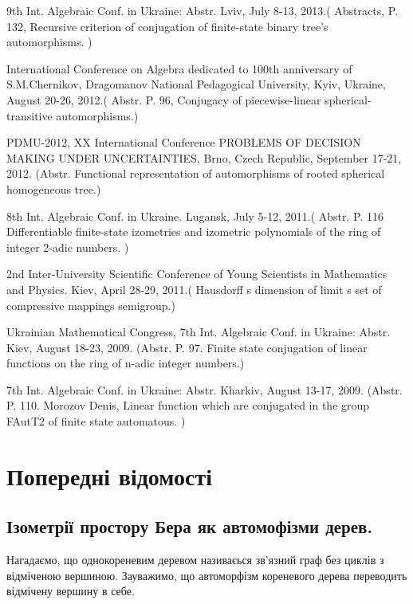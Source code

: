 \documentclass[a4paper,12pt]{article} \usepackage{a4wide}
\numberwithin{equation}{subsection}
\begin{document}
9th Int. Algebraic Conf. in Ukraine: Abstr. Lviv, July 8-13, 2013.( Abstracts, P. 132, Recursive criterion of conjugation of finite-state binary tree’s
automorphisms. ) 


International Conference on Algebra dedicated to 100th anniversary of S.M.Chernikov,
Dragomanov National Pedagogical University, Kyiv, Ukraine, August 20-26, 2012.( Abstr.  P. 96,  Conjugacy of piecewise-linear spherical-transitive automorphisms.)

 PDMU-2012,
XX International Conference PROBLEMS OF DECISION MAKING UNDER UNCERTAINTIES,
Brno, Czech Republic, September 17-21, 2012. (Abstr. Functional representation of automorphisms of rooted spherical homogeneous tree.)

 8th Int. Algebraic Conf. in Ukraine. Lugansk, July 5-12,
2011.( Abstr. P. 116 Differentiable finite-state izometries and izometric polynomials of the ring
of integer 2-adic numbers. )


2nd Inter-University Scientific Conference of Young Scientists in Mathematics and
Physics. Kiev, April 28-29, 2011.( Hausdorff s dimension of limit s set of compressive mappings semigroup.)

Ukrainian Mathematical Congress, 7th Int.
Algebraic Conf. in Ukraine: Abstr. Kiev, August 18-23, 2009. (Abstr. P. 97. Finite state conjugation of linear functions on the ring of n-adic integer
numbers.)

7th Int. Algebraic Conf. in Ukraine: Abstr. Kharkiv, August 13-17, 2009.
(Abstr. P. 110. Morozov Denis, Linear function which are conjugated in the group FAutT2 of finite state
automatous. )




\newpage

\section{Попередні відомості}
\subsection{Ізометрії простору Бера як автомофізми дерев.}
Нагадаємо, що однокореневим деревом називаєься зв'язний граф без циклів з відміченою вершиною.
 Зауважимо, що автоморфізм кореневого дерева переводить відмічену вершину в себе.
\end{document}
